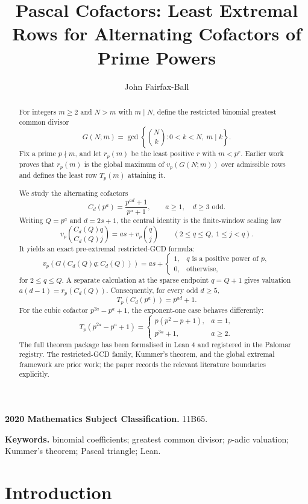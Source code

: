 \documentclass[11pt]{article}
\title{Pascal Cofactors: Least Extremal Rows for Alternating Cofactors of Prime Powers}
\author{John Fairfax-Ball}
\date{}
\theoremstyle{definition}
\theoremstyle{remark}
\begin{document}
\maketitle

\begin{abstract}
For integers \(m\ge2\) and \(N>m\) with \(m\mid N\), define the restricted
binomial greatest common divisor
\[
  G(N;m)=\gcd\left\{\binom Nk:0<k<N,\ m\mid k\right\}.
\]
Fix a prime \(p\nmid m\), and let \(r_p(m)\) be the least positive \(r\) with
\(m<p^r\). Earlier work proves that \(r_p(m)\) is the global maximum of
\(v_p(G(N;m))\) over admissible rows and defines the least row \(T_p(m)\)
attaining it.

We study the alternating cofactors
\[
  C_d(p^a)=\frac{p^{ad}+1}{p^a+1},
  \qquad a\ge1,\quad d\ge3\text{ odd}.
\]
Writing \(Q=p^a\) and \(d=2s+1\), the central identity is the finite-window
scaling law
\[
  v_p\binom{C_d(Q)q}{C_d(Q)j}
  =as+v_p\binom qj
  \qquad(2\le q\le Q,\ 1\le j<q).
\]
It yields an exact pre-extremal restricted-GCD formula:
\[
  v_p(G(C_d(Q)q;C_d(Q)))
  =
  as+
  \begin{cases}
    1,&q\text{ is a positive power of }p,\\
    0,&\text{otherwise},
  \end{cases}
\]
for \(2\le q\le Q\).  A separate calculation at the sparse endpoint
\(q=Q+1\) gives valuation \(a(d-1)=r_p(C_d(Q))\).  Consequently, for every
odd \(d\ge5\),
\[
  T_p(C_d(p^a))=p^{ad}+1.
\]
For the cubic cofactor \(p^{2a}-p^a+1\), the exponent-one case behaves
differently:
\[
  T_p(p^{2a}-p^a+1)=
  \begin{cases}
    p(p^2-p+1),&a=1,\\
    p^{3a}+1,&a\ge2.
  \end{cases}
\]
The full theorem package has been formalised in Lean 4 and registered in the
Palomar registry.  The restricted-GCD family, Kummer's theorem, and the global
extremal framework are prior work; the paper records the relevant literature
boundaries explicitly.
\end{abstract}

\medskip
\noindent\textbf{2020 Mathematics Subject Classification.} 11B65.

\noindent\textbf{Keywords.} binomial coefficients; greatest common divisor;
\(p\)-adic valuation; Kummer's theorem; Pascal triangle; Lean.

\section{Introduction}\label{sec:intro}
\end{document}
